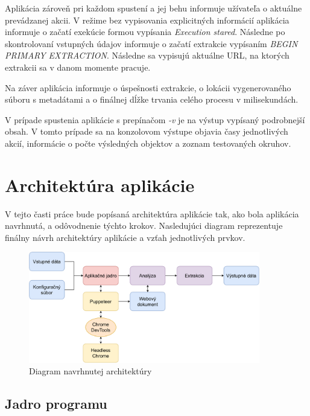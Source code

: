 Aplikácia zároveň pri každom spustení a jej behu informuje užívateľa o aktuálne prevádzanej akcii. V režime bez vypisovania explicitných informácií aplikácia informuje o začatí exekúcie formou vypísania \textit{Execution stared}. Následne po skontrolovaní vstupných údajov informuje o začatí extrakcie vypísaním \textit{BEGIN PRIMARY EXTRACTION}. Následne sa vypisujú aktuálne URL, na ktorých extrakcii sa v danom momente pracuje. 

Na záver aplikácia informuje o úspešnosti extrakcie, o lokácii vygenerovaného súboru s metadátami a o finálnej dĺžke trvania celého procesu v milisekundách.

V prípade spustenia aplikácie s prepínačom \textit{-v} je na výstup vypísaný podrobnejší obsah. V tomto prípade sa na konzolovom výstupe objavia časy jednotlivých akcií, informácie o počte výsledných objektov a zoznam testovaných okruhov.

\section{Architektúra aplikácie}

V tejto časti práce bude popísaná architektúra aplikácie tak, ako bola aplikácia navrhnutá, a odôvodnenie týchto krokov. Nasledujúci diagram reprezentuje finálny návrh architektúry aplikácie a vzťah jednotlivých prvkov.

\bigskip

\begin{figure}[hbt]
	\centering
	\includegraphics[width=0.9\textwidth]{obrazky-figures/architecture.pdf}
	\caption{Diagram navrhnutej architektúry}
	\label{architecture}
\end{figure}

\bigskip

\subsection{Jadro programu}


